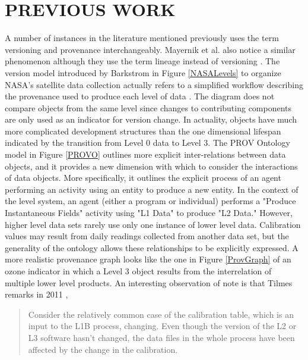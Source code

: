 
\chapter{PREVIOUS WORK}

A number of instances in the literature mentioned previously uses the term versioning and provenance interchangeably.
Mayernik et al. also notice a similar phenomenon although they use the term lineage instead of versioning \cite{MatthewS.Mayernik201312-039}.
The version model introduced by Barkstrom in Figure \ref{NASALevels} to organize NASA's satellite data collection actually refers to a simplified workflow describing the provenance used to produce each level of data \cite{Barkstrom2003}.
The diagram does not compare objects from the same level since changes to contributing components are only used as an indicator for version change.
In actuality, objects have much more complicated development structures than the one dimensional lifespan indicated by the transition from Level 0 data to Level 3.
The PROV Ontology model in Figure \ref{PROVO} outlines more explicit inter-relations between data objects, and it provides a new dimension with which to consider the interactions of data objects.
More specifically, it outlines the explicit process of an agent performing an activity using an entity to produce a new entity.
In the context of the level system, an agent (either a program or individual) performs a "Produce Instantaneous Fields" activity using "L1 Data" to produce "L2 Data."
However, higher level data sets rarely use only one instance of lower level data.
Calibration values may result from daily readings collected from another data set, but the generality of the ontology allows these relationships to be explicitly expressed.
A more realistic provenance graph looks like the one in Figure \ref{ProvGraph} of an ozone indicator in which a Level 3 object results from the interrelation of multiple lower level products.
An interesting observation of note is that Tilmes remarks in 2011 \cite{TILMES2011548}, 
\begin{quotation}
	Consider the relatively common case of the calibration table, which is an input to the L1B process, changing. Even though the version of the L2 or L3 software hasn’t changed, the data files in the whole process have been affected by the change in the calibration.
\end{quotation}
